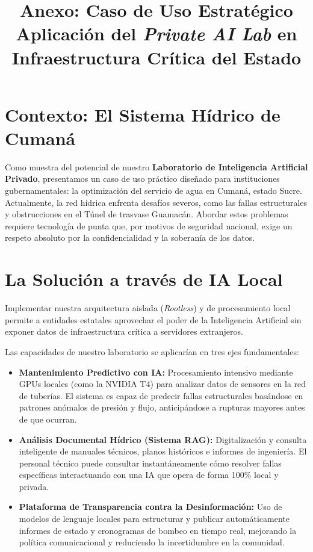 \documentclass[11pt,a4paper]{article}
\title{\vspace{-2cm}\textbf{Anexo: Caso de Uso Estratégico}\\ \Large Aplicación del \textit{Private AI Lab} en Infraestructura Crítica del Estado}
\author{}
\date{}
\begin{document}
\maketitle
\vspace{-1.5cm}

\section*{Contexto: El Sistema Hídrico de Cumaná}
Como muestra del potencial de nuestro \textbf{Laboratorio de Inteligencia Artificial Privado}, presentamos un caso de uso práctico diseñado para instituciones gubernamentales: la optimización del servicio de agua en Cumaná, estado Sucre. Actualmente, la red hídrica enfrenta desafíos severos, como las fallas estructurales y obstrucciones en el Túnel de trasvase Guamacán. Abordar estos problemas requiere tecnología de punta que, por motivos de seguridad nacional, exige un respeto absoluto por la confidencialidad y la soberanía de los datos.

\section*{La Solución a través de IA Local}
Implementar nuestra arquitectura aislada (\textit{Rootless}) y de procesamiento local permite a entidades estatales aprovechar el poder de la Inteligencia Artificial sin exponer datos de infraestructura crítica a servidores extranjeros. 

Las capacidades de nuestro laboratorio se aplicarían en tres ejes fundamentales:

\begin{itemize}
    \item \textbf{Mantenimiento Predictivo con IA:} Procesamiento intensivo mediante GPUs locales (como la NVIDIA T4) para analizar datos de sensores en la red de tuberías. El sistema es capaz de predecir fallas estructurales basándose en patrones anómalos de presión y flujo, anticipándose a rupturas mayores antes de que ocurran.
    \item \textbf{Análisis Documental Hídrico (Sistema RAG):} Digitalización y consulta inteligente de manuales técnicos, planos históricos e informes de ingeniería. El personal técnico puede consultar instantáneamente cómo resolver fallas específicas interactuando con una IA que opera de forma 100\% local y privada.
    \item \textbf{Plataforma de Transparencia contra la Desinformación:} Uso de modelos de lenguaje locales para estructurar y publicar automáticamente informes de estado y cronogramas de bombeo en tiempo real, mejorando la política comunicacional y reduciendo la incertidumbre en la comunidad.
\end{itemize}
\end{document}

